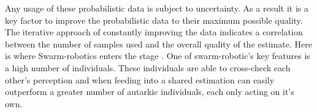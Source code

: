 Any usage of these probabilistic data is subject to uncertainty. As a result it is a key factor to improve the probabilistic data to their maximum possible quality. The iterative approach of constantly improving the data indicates a correlation between the number of samples used and the overall quality of the estimate. Here is where Swarm-robotics enters the stage . One of swarm-robotic's key features is a high number of individuals. These individuals are able to cross-check each other's perception and when feeding into a shared estimation can easily outperform a greater number of autarkic individuals, each only acting on it's own.

